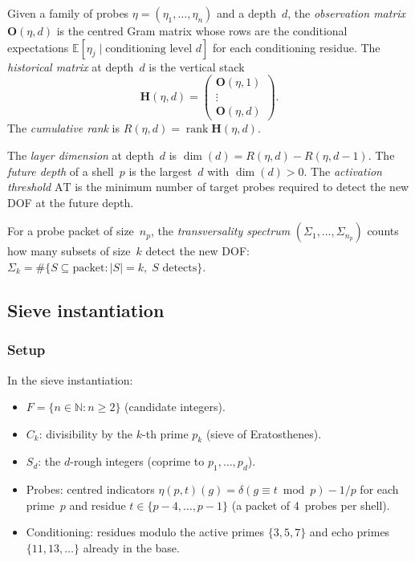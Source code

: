 \documentclass[12pt,a4paper]{article}
\begin{document}
\begin{definition}
\label{def:obs_matrix}
Given a family of probes $\eta = (\eta_1, \ldots, \eta_n)$ and a depth~$d$,
the \emph{observation matrix} $\mathbf{O}(\eta, d)$ is the centred Gram matrix
whose rows are the conditional expectations
$\mathbb{E}[\eta_j \mid \text{conditioning level } d]$
for each conditioning residue.  The \emph{historical matrix} at depth~$d$
is the vertical stack
\[
  \mathbf{H}(\eta, d) = \begin{pmatrix}
    \mathbf{O}(\eta, 1) \\ \vdots \\ \mathbf{O}(\eta, d)
  \end{pmatrix}.
\]
The \emph{cumulative rank} is $R(\eta, d) = \operatorname{rank} \mathbf{H}(\eta, d)$.
\end{definition}

\begin{definition}
\label{def:layer_AT}
The \emph{layer dimension} at depth~$d$ is
$\dim(d) = R(\eta, d) - R(\eta, d{-}1)$.
The \emph{future depth} of a shell~$p$ is the largest~$d$ with $\dim(d) > 0$.
The \emph{activation threshold} $\mathrm{AT}$ is the minimum number of target
probes required to detect the new DOF at the future depth.
\end{definition}

\begin{definition}
\label{def:sigma}
For a probe packet of size~$n_p$, the \emph{transversality spectrum}
$(\Sigma_1, \ldots, \Sigma_{n_p})$ counts how many subsets of size~$k$
detect the new DOF: $\Sigma_k = \#\{S \subseteq \text{packet} : |S| = k,\;
S \text{ detects}\}$.
\end{definition}


\subsection{Sieve instantiation}
\label{sec:PM_sieve}

\subsubsection{Setup}

In the sieve instantiation:
\begin{itemize}[nosep]
  \item $F = \{n \in \mathbb{N} : n \ge 2\}$ (candidate integers).
  \item $C_k$: divisibility by the $k$-th prime $p_k$
    (sieve of Eratosthenes).
  \item $S_d$: the $d$-rough integers (coprime to $p_1, \ldots, p_d$).
  \item Probes: centred indicators
    $\eta(p, t)(g) = \delta(g \equiv t \bmod p) - 1/p$
    for each prime~$p$ and residue $t \in \{p{-}4, \ldots, p{-}1\}$
    (a packet of 4~probes per shell).
  \item Conditioning: residues modulo the active primes $\{3, 5, 7\}$
    and echo primes $\{11, 13, \ldots\}$ already in the base.
\end{itemize}
\end{document}
